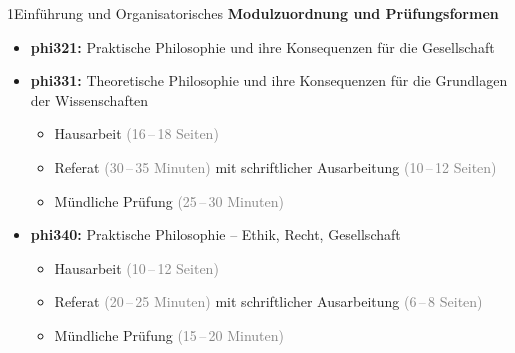 \documentclass[xcolor=table,9pt,aspectratio=169]{beamer}
\begin{document}
\begin{frame}{\vspace*{10mm}1\hspace*{1em}Einführung und Organisatorisches}
\textbf{Modulzuordnung und Prüfungsformen}
\begin{itemize}
   \item \textbf{phi321:} Praktische Philosophie und ihre Konsequenzen für die Gesellschaft
   \item \textbf{phi331:} Theoretische Philosophie und ihre Konsequenzen für die Grundlagen der Wissenschaften
   \begin{itemize}
      \item Hausarbeit \textcolor{gray}{(16\,--\,18 Seiten)}
      \item Referat \textcolor{gray}{(30\,--\,35 Minuten)} mit schriftlicher Ausarbeitung \textcolor{gray}{(10\,--\,12 Seiten)}
      \item Mündliche Prüfung \textcolor{gray}{(25\,--\,30 Minuten)}
   \end{itemize}
   \item \textbf{phi340:} Praktische Philosophie -- Ethik, Recht, Gesellschaft
   \begin{itemize}
      \item Hausarbeit \textcolor{gray}{(10\,--\,12 Seiten)}
      \item Referat \textcolor{gray}{(20\,--\,25 Minuten)} mit schriftlicher Ausarbeitung \textcolor{gray}{(6\,--\,8 Seiten)}
      \item Mündliche Prüfung \textcolor{gray}{(15\,--\,20 Minuten)}
   \end{itemize}
\end{itemize}
\end{frame}
\end{document}
